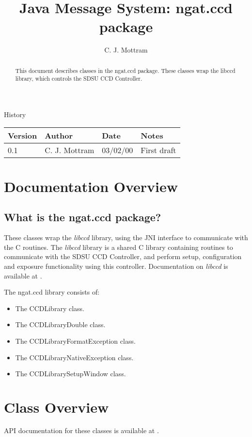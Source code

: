 \documentclass[10pt,a4paper]{article}
\title{Java Message System: ngat.ccd package}
\author{C. J. Mottram}
\date{}
\begin{document}
\thispagestyle{empty}
\maketitle
\begin{abstract}
This document describes classes in the ngat.ccd package.
These classes wrap the libccd library, which controls the SDSU CCD Controller.
\end{abstract}

\centerline{\Large History}
\begin{center}
\begin{tabular}{|l|l|l|p{15em}|}
\hline
{\bf Version} & {\bf Author} & {\bf Date} & {\bf Notes} \\
\hline
0.1 &              C. J. Mottram & 03/02/00 & First draft \\
\hline
\end{tabular}
\end{center}

\newpage
\tableofcontents
\listoffigures
\listoftables
\newpage

\section{Documentation Overview}
\subsection{What is the ngat.ccd package?}
These classes wrap the {\em libccd} library, using the JNI interface to communicate with the C routines.
The {\em libccd} library is a shared C library containing routines to communicate with the SDSU CCD Controller,
and perform setup, configuration and exposure functionality using this controller.
Documentation on {\em libccd} is available at \cite{bib:libccd}.

The ngat.ccd library consists of:
\begin{itemize}
\item The CCDLibrary class.
\item The CCDLibraryDouble class.
\item The CCDLibraryFormatException class.
\item The CCDLibraryNativeException class.
\item The CCDLibrarySetupWindow class.
\end{itemize}

\section{Class Overview}
API documentation for these classes is available at \cite{bib:ngatccdapi}.
\end{document}
